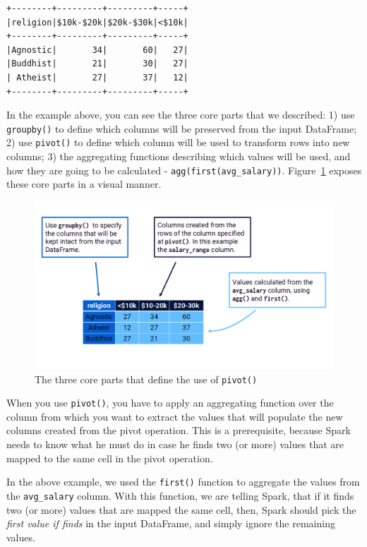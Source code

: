 \documentclass[
  11pt,
  letterpaper,
  DIV=11,
  numbers=noendperiod]{scrreprt}
\begin{document}
\begin{verbatim}
+--------+---------+---------+-----+
|religion|$10k-$20k|$20k-$30k|<$10k|
+--------+---------+---------+-----+
|Agnostic|       34|       60|   27|
|Buddhist|       21|       30|   27|
| Atheist|       27|       37|   12|
+--------+---------+---------+-----+
\end{verbatim}

In the example above, you can see the three core parts that we
described: 1) use \texttt{groupby()} to define which columns will be
preserved from the input DataFrame; 2) use \texttt{pivot()} to define
which column will be used to transform rows into new columns; 3) the
aggregating functions describing which values will be used, and how they
are going to be calculated -
\texttt{agg(first(\textquotesingle{}avg\_salary\textquotesingle{}))}.
Figure~\ref{fig-pivot2} exposes these core parts in a visual manner.

\begin{figure}

{\centering \includegraphics{Chapters/./../Figures/pivot2.png}

}

\caption{\label{fig-pivot2}The three core parts that define the use of
\texttt{pivot()}}

\end{figure}

When you use \texttt{pivot()}, you have to apply an aggregating function
over the column from which you want to extract the values that will
populate the new columns created from the pivot operation. This is a
prerequisite, because Spark needs to know what he must do in case he
finds two (or more) values that are mapped to the same cell in the pivot
operation.

In the above example, we used the \texttt{first()} function to aggregate
the values from the \texttt{avg\_salary} column. With this function, we
are telling Spark, that if it finds two (or more) values that are mapped
the same cell, then, Spark should pick the \emph{first value if finds}
in the input DataFrame, and simply ignore the remaining values.
\end{document}
